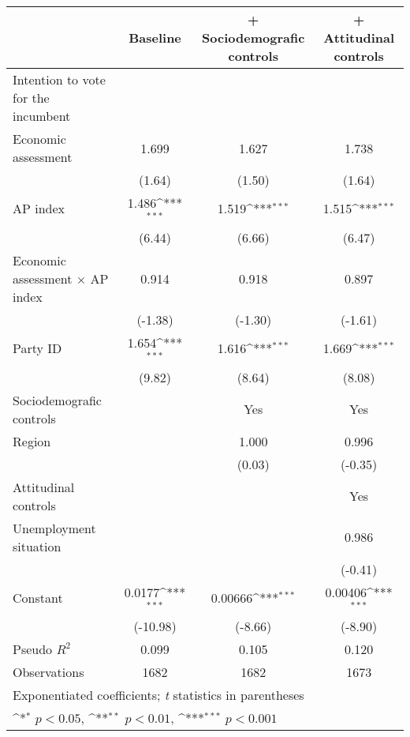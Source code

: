 {
\def\sym#1{\ifmmode^{#1}\else\(^{#1}\)\fi}
\begin{tabular}{l*{3}{c}}
\toprule
                & Baseline         &+ Sociodemografic controls         &+ Attitudinal controls         \\
\midrule
Intention to vote for the incumbent&                  &                  &                  \\
Economic assessment&    1.699         &    1.627         &    1.738         \\
                &   (1.64)         &   (1.50)         &   (1.64)         \\
AP index        &    1.486\sym{***}&    1.519\sym{***}&    1.515\sym{***}\\
                &   (6.44)         &   (6.66)         &   (6.47)         \\
Economic assessment $\times$ AP index&    0.914         &    0.918         &    0.897         \\
                &  (-1.38)         &  (-1.30)         &  (-1.61)         \\
Party ID        &    1.654\sym{***}&    1.616\sym{***}&    1.669\sym{***}\\
                &   (9.82)         &   (8.64)         &   (8.08)         \\
Sociodemografic controls&                  &      Yes         &      Yes         \\
Region          &                  &    1.000         &    0.996         \\
                &                  &   (0.03)         &  (-0.35)         \\
Attitudinal controls&                  &                  &      Yes         \\
Unemployment situation&                  &                  &    0.986         \\
                &                  &                  &  (-0.41)         \\
Constant        &   0.0177\sym{***}&  0.00666\sym{***}&  0.00406\sym{***}\\
                & (-10.98)         &  (-8.66)         &  (-8.90)         \\
\midrule
Pseudo \(R^{2}\)&    0.099         &    0.105         &    0.120         \\
Observations    &     1682         &     1682         &     1673         \\
\bottomrule
\multicolumn{4}{l}{\footnotesize Exponentiated coefficients; \textit{t} statistics in parentheses}\\
\multicolumn{4}{l}{\footnotesize \sym{*} \(p<0.05\), \sym{**} \(p<0.01\), \sym{***} \(p<0.001\)}\\
\end{tabular}
}
